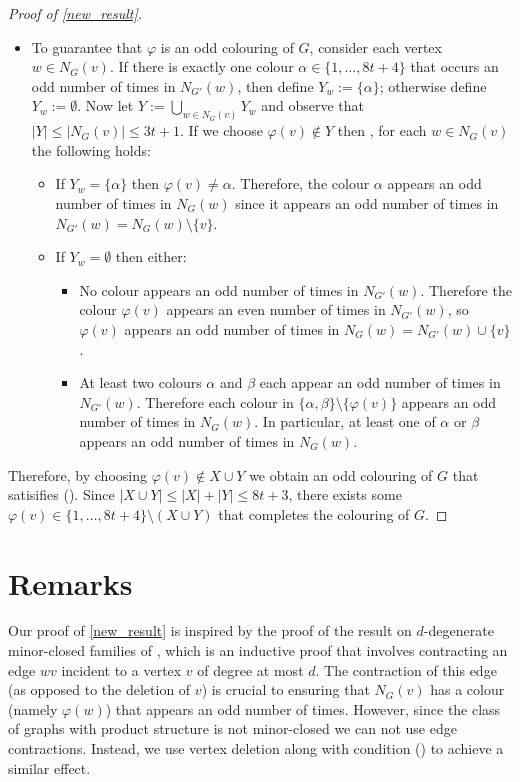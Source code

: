 \documentclass{patmorin}
\begin{document}
\begin{proof}[Proof of \cref{new_result}]
\begin{itemize}
    \item To guarantee that $\varphi$ is an odd colouring of $G$, consider each vertex $w\in N_{G}(v)$.  If there is exactly one colour $\alpha\in\{1,\ldots,8t+4\}$ that occurs an odd number of times in $N_{G'}(w)$, then define $Y_{w} := \{\alpha\}$; otherwise define $Y_{w}:=\emptyset$. Now let $Y:=\bigcup_{w\in N_{G}(v)} Y_{w}$ and observe that $|Y|\le |N_G(v)|\le 3t+1$.
    If we choose $\varphi(v)\not\in Y$ then , for each $w\in N_{G}(v)$ the following holds:
    \begin{itemize}
      \item If $Y_{w}=\{\alpha\}$ then $\varphi(v)\neq\alpha$. Therefore, the colour $\alpha$ appears an odd number of times in $N_{G}(w)$ since it appears an odd number of times in $N_{G'}(w)=N_G(w)\setminus\{v\}$.
      \item If $Y_{w}=\emptyset$ then either:
      \begin{itemize}
        \item No colour appears an odd number of times in $N_{G'}(w)$.  Therefore the colour $\varphi(v)$ appears an even number of times in $N_{G'}(w)$, so $\varphi(v)$ appears an odd number of times in $N_G(w)=N_{G'}(w)\cup\{v\}$.
        \item At least two colours $\alpha$ and $\beta$ each appear an odd number of times in $N_{G'}(w)$.  Therefore each colour in $\{\alpha,\beta\}\setminus\{\varphi(v)\}$ appears an odd number of times in $N_{G}(w)$.  In particular, at least one of $\alpha$ or $\beta$ appears an odd number of times in $N_G(w)$.
      \end{itemize}
    \end{itemize}
  \end{itemize}
  Therefore, by choosing $\varphi(v)\not\in X\cup Y$ we obtain an odd colouring of $G$ that satisifies ().  Since $|X\cup Y|\le |X|+|Y|\le 8t+3$, there exists some $\varphi(v)\in \{1,\ldots,8t+4\}\setminus(X\cup Y)$ that completes the colouring of $G$.
\end{proof}


\section{Remarks}

Our proof of \cref{new_result} is inspired by the proof of the result on $d$-degenerate minor-closed families of \citet{cranston.lafferty.ea:note}, which is an inductive proof that involves contracting an edge $wv$ incident to a vertex $v$ of degree at most $d$.  The contraction of this edge (as opposed to the deletion of $v$) is crucial to ensuring that $N_G(v)$ has a colour (namely $\varphi(w)$) that appears an odd number of times.  However, since the class of graphs with product structure is not minor-closed we can not use edge contractions. Instead, we use vertex deletion along with condition () to achieve a similar effect.
\end{document}
